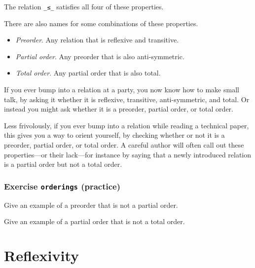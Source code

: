 The relation \texttt{\_≤\_} satisfies all four of these properties.

There are also names for some combinations of these properties.

\begin{itemize}
\tightlist
\item
  \emph{Preorder}. Any relation that is reflexive and transitive.
\item
  \emph{Partial order}. Any preorder that is also anti-symmetric.
\item
  \emph{Total order}. Any partial order that is also total.
\end{itemize}

If you ever bump into a relation at a party, you now know how to make
small talk, by asking it whether it is reflexive, transitive,
anti-symmetric, and total. Or instead you might ask whether it is a
preorder, partial order, or total order.

Less frivolously, if you ever bump into a relation while reading a
technical paper, this gives you a way to orient yourself, by checking
whether or not it is a preorder, partial order, or total order. A
careful author will often call out these properties---or their
lack---for instance by saying that a newly introduced relation is a
partial order but not a total order.

\hypertarget{Relations-orderings}{%
\subsubsection{\texorpdfstring{Exercise \texttt{orderings}
(practice)}{Exercise orderings (practice)}}\label{Relations-orderings}}

Give an example of a preorder that is not a partial order.

\begin{fence}
\begin{code}%
\>[0]\<%
\end{code}
\end{fence}

Give an example of a partial order that is not a total order.

\begin{fence}
\begin{code}%
\>[0]\<%
\end{code}
\end{fence}

\hypertarget{reflexivity}{%
\section{Reflexivity}\label{reflexivity}}

